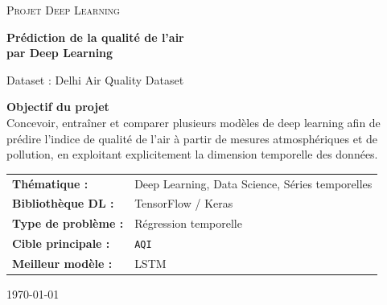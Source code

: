 \documentclass[11pt,a4paper]{article}
\newcommand{\aqi}{\texttt{AQI}}
\begin{document}
\begin{titlepage}
    \centering
    \vspace*{1.5cm}

    {\scshape\LARGE Projet Deep Learning \par}
    \vspace{1.2cm}

    {\Huge\bfseries Prédiction de la qualité de l'air\\[0.3cm] par Deep Learning\par}
    \vspace{0.7cm}

    {\Large Dataset : Delhi Air Quality Dataset\par}
    \vspace{1.5cm}


    \vspace{1.5cm}

    \begin{highlightbox}
    \centering
    \textbf{Objectif du projet} \\[0.2cm]
    Concevoir, entraîner et comparer plusieurs modèles de deep learning afin de prédire
    l'indice de qualité de l'air à partir de mesures atmosphériques et de pollution,
    en exploitant explicitement la dimension temporelle des données.
    \end{highlightbox}

    \vfill

    \begin{tabular}{>{\bfseries}l l}
        Thématique : & Deep Learning, Data Science, Séries temporelles \\
        Bibliothèque DL : & TensorFlow / Keras \\
        Type de problème : & Régression temporelle \\
        Cible principale : & \aqi \\
        Meilleur modèle : & LSTM \\
    \end{tabular}

    \vfill
    {\large \today\par}
\end{titlepage}
\end{document}
